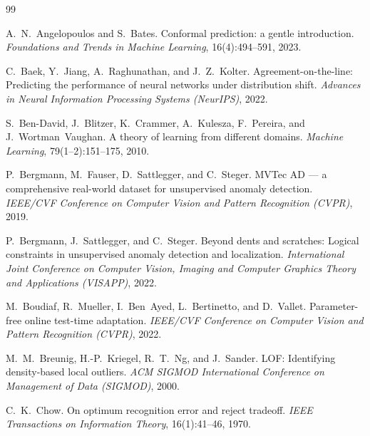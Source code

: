 
\begin{thebibliography}{99}

A.~N.~Angelopoulos and S.~Bates.
Conformal prediction: a gentle introduction.
\textit{Foundations and Trends in Machine Learning}, 16(4):494--591, 2023.

C.~Baek, Y.~Jiang, A.~Raghunathan, and J.~Z.~Kolter.
Agreement-on-the-line: Predicting the performance of neural networks
under distribution shift.
\textit{Advances in Neural Information Processing Systems (NeurIPS)}, 2022.

S.~Ben-David, J.~Blitzer, K.~Crammer, A.~Kulesza, F.~Pereira, and
J.~Wortman~Vaughan.
A theory of learning from different domains.
\textit{Machine Learning}, 79(1--2):151--175, 2010.

P.~Bergmann, M.~Fauser, D.~Sattlegger, and C.~Steger.
MVTec AD --- a comprehensive real-world dataset for unsupervised anomaly
detection.
\textit{IEEE/CVF Conference on Computer Vision and Pattern Recognition (CVPR)}, 2019.

P.~Bergmann, J.~Sattlegger, and C.~Steger.
Beyond dents and scratches: Logical constraints in unsupervised anomaly
detection and localization.
\textit{International Joint Conference on Computer Vision, Imaging and
Computer Graphics Theory and Applications (VISAPP)}, 2022.

M.~Boudiaf, R.~Mueller, I.~Ben~Ayed, L.~Bertinetto, and D.~Vallet.
Parameter-free online test-time adaptation.
\textit{IEEE/CVF Conference on Computer Vision and Pattern Recognition (CVPR)}, 2022.

M.~M.~Breunig, H.-P.~Kriegel, R.~T.~Ng, and J.~Sander.
LOF: Identifying density-based local outliers.
\textit{ACM SIGMOD International Conference on Management of Data (SIGMOD)}, 2000.

C.~K.~Chow.
On optimum recognition error and reject tradeoff.
\textit{IEEE Transactions on Information Theory}, 16(1):41--46, 1970.


\end{thebibliography}
